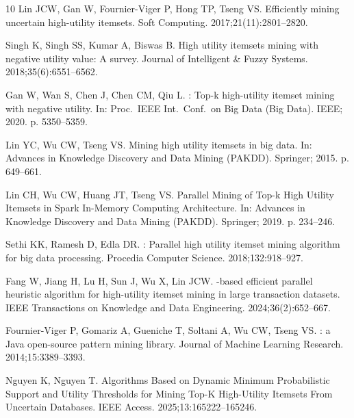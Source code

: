 \documentclass[pdflatex,sn-vancouver-num]{sn-jnl}
\theoremstyle{thmstyleone}%
\theoremstyle{thmstyletwo}%
\theoremstyle{thmstylethree}%
\begin{document}
\begin{thebibliography}{10}
Lin JCW, Gan W, Fournier-Viger P, Hong TP, Tseng VS.
\newblock Efficiently mining uncertain high-utility itemsets.
\newblock Soft Computing. 2017;21(11):2801--2820.

Singh K, Singh SS, Kumar A, Biswas B.
\newblock High utility itemsets mining with negative utility value: A survey.
\newblock Journal of Intelligent \& Fuzzy Systems. 2018;35(6):6551--6562.

Gan W, Wan S, Chen J, Chen CM, Qiu L.
: Top-k high-utility itemset mining with negative utility.
\newblock In: Proc.\ IEEE Int.\ Conf.\ on Big Data (Big Data). IEEE; 2020. p.
  5350--5359.

Lin YC, Wu CW, Tseng VS.
\newblock Mining high utility itemsets in big data.
\newblock In: Advances in Knowledge Discovery and Data Mining (PAKDD).
  Springer; 2015. p. 649--661.

Lin CH, Wu CW, Huang JT, Tseng VS.
\newblock Parallel Mining of Top-k High Utility Itemsets in Spark In-Memory
  Computing Architecture.
\newblock In: Advances in Knowledge Discovery and Data Mining (PAKDD).
  Springer; 2019. p. 234--246.

Sethi KK, Ramesh D, Edla DR.
: Parallel high utility itemset mining algorithm for big data
  processing.
\newblock Procedia Computer Science. 2018;132:918--927.

Fang W, Jiang H, Lu H, Sun J, Wu X, Lin JCW.
-based efficient parallel heuristic algorithm for high-utility
  itemset mining in large transaction datasets.
\newblock IEEE Transactions on Knowledge and Data Engineering.
  2024;36(2):652--667.

Fournier-Viger P, Gomariz A, Gueniche T, Soltani A, Wu CW, Tseng VS.
: a Java open-source pattern mining library.
\newblock Journal of Machine Learning Research. 2014;15:3389--3393.

Nguyen K, Nguyen T.
\newblock Algorithms Based on Dynamic Minimum Probabilistic Support and Utility
  Thresholds for Mining Top-K High-Utility Itemsets From Uncertain Databases.
\newblock IEEE Access. 2025;13:165222--165246.


\end{thebibliography}
\end{document}
